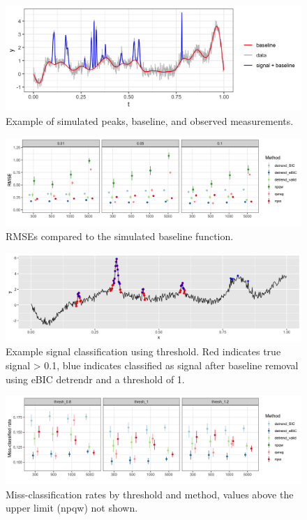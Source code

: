 \documentclass[12pt]{article}
\numberwithin{equation}{section}
\theoremstyle{plain}
\begin{document}
\begin{figure}
	\caption{Example of simulated peaks, baseline, and observed measurements.}
	\includegraphics[width = \linewidth]{Figures/ex_peaks.png}
\end{figure}



\begin{figure}[h!]
	\caption{RMSEs compared to the simulated baseline function.}
	\includegraphics[width = \linewidth]{Figures/peaks_mse.png}
\end{figure}

\begin{figure}[h!]
	\caption{Example signal classification using threshold. Red indicates true signal > 0.1, blue indicates classified as signal after baseline removal using eBIC detrendr and a threshold of 1.}
	\includegraphics[width = \linewidth]{Figures/peaks_eg_class.png}
\end{figure}

\begin{figure}[h!]
	\caption{Miss-classification rates by threshold and method, values above the upper limit (npqw) not shown.}
	\includegraphics[width = \linewidth]{Figures/peaks_missclass.png}
\end{figure}
\end{document}
